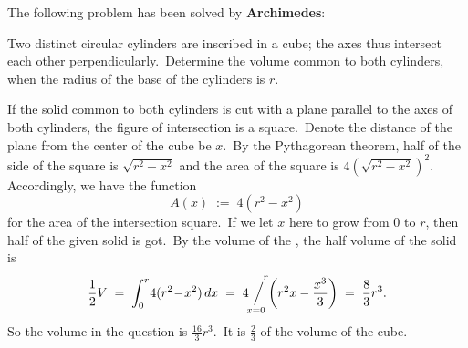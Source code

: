 \documentclass[12pt]{article}
\newcommand{\sijoitus}[2]%
{\operatornamewithlimits{\Big/}_{\!\!\!#1}^{\,#2}}
\begin{document}
The following problem has been solved by \textbf{Archimedes}:

Two distinct circular cylinders are inscribed in a cube; the axes thus intersect each other perpendicularly.\, Determine the volume common to both cylinders, when the radius of the base of the cylinders is $r$.

If the solid common to both cylinders is cut with a plane parallel to the axes of both cylinders, the figure of intersection is a square.\, Denote the distance of the plane from the center of the cube be $x$.\, By the Pythagorean theorem, half of the side of the square is $\sqrt{r^2\!-\!x^2}$ and the area of the square is 
$4(\sqrt{r^2\!-\!x^2})^2$.  Accordingly, we have the function 
$$A(x) \;:=\; 4(r^2\!-\!x^2)$$
for the area of the intersection square.\, If we let $x$ here to grow from $0$ to $r$, then half of the given solid is got.\, By the volume  of the , the half volume of the solid is
$$\frac{1}{2}V \;=\; \int_0^r\!4(r^2\!-\!x^2)\,dx \;=\; 4\!\sijoitus{x=0}{\quad r}\!\left(r^2x-\frac{x^3}{3}\right) \;=\; \frac{8}{3}r^3.$$
So the volume in the question is $\frac{16}{3}r^3$.\, It is $\displaystyle\frac{2}{3}$ of the volume of the cube.

\end{document}
